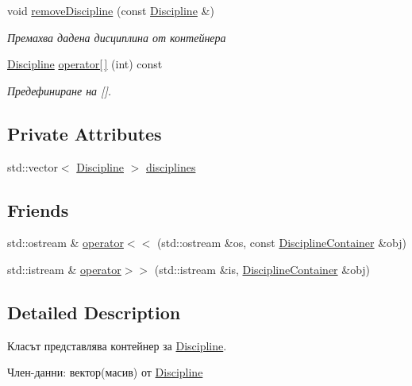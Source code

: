 \begin{DoxyCompactItemize}
void \hyperlink{class_discipline_container_a7c2ef60c5fa05157ad2b9e86f36b33ca}{remove\+Discipline} (const \hyperlink{class_discipline}{Discipline} \&)
\begin{DoxyCompactList}\small\item\em Премахва дадена дисциплина от контейнера \end{DoxyCompactList}\item 
\hyperlink{class_discipline}{Discipline} \hyperlink{class_discipline_container_aba611613c69a52dc6aa84ca511140016}{operator\mbox{[}$\,$\mbox{]}} (int) const
\begin{DoxyCompactList}\small\item\em Предефиниране на \mbox{[}\mbox{]}. \end{DoxyCompactList}\end{DoxyCompactItemize}
\subsection*{Private Attributes}
\begin{DoxyCompactItemize}
\item 
std\+::vector$<$ \hyperlink{class_discipline}{Discipline} $>$ \hyperlink{class_discipline_container_aa751d8be73af398d0f08514954b352ca}{disciplines}
\end{DoxyCompactItemize}
\subsection*{Friends}
\begin{DoxyCompactItemize}
\item 
std\+::ostream \& \hyperlink{class_discipline_container_a607f596b8da0b7ba4b4ac9c7052a4dc8}{operator$<$$<$} (std\+::ostream \&os, const \hyperlink{class_discipline_container}{Discipline\+Container} \&obj)
\item 
std\+::istream \& \hyperlink{class_discipline_container_ae5ca1b37f6cd35db450f74531fb500d3}{operator$>$$>$} (std\+::istream \&is, \hyperlink{class_discipline_container}{Discipline\+Container} \&obj)
\end{DoxyCompactItemize}


\subsection{Detailed Description}
Класът представлява контейнер за \hyperlink{class_discipline}{Discipline}. 

Член-\/данни\+: вектор(масив) от \hyperlink{class_discipline}{Discipline} 

